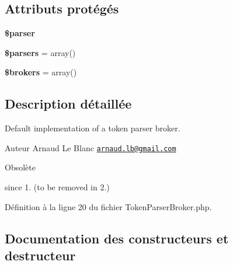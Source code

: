 \subsection*{Attributs protégés}
\begin{DoxyCompactItemize}
\item 
{\bfseries \$parser}\hypertarget{class_twig___token_parser_broker_a147a766daa03d52576c7345fea31c945}{}\label{class_twig___token_parser_broker_a147a766daa03d52576c7345fea31c945}

\item 
{\bfseries \$parsers} = array()\hypertarget{class_twig___token_parser_broker_ae7df9b3add8c1b302615fc85fbd27de0}{}\label{class_twig___token_parser_broker_ae7df9b3add8c1b302615fc85fbd27de0}

\item 
{\bfseries \$brokers} = array()\hypertarget{class_twig___token_parser_broker_a5cd4d3909a056e1cf2d0c68d5d7a89f5}{}\label{class_twig___token_parser_broker_a5cd4d3909a056e1cf2d0c68d5d7a89f5}

\end{DoxyCompactItemize}


\subsection{Description détaillée}
Default implementation of a token parser broker.

\begin{DoxyAuthor}{Auteur}
Arnaud Le Blanc \href{mailto:arnaud.lb@gmail.com}{\tt arnaud.\+lb@gmail.\+com}
\end{DoxyAuthor}
\begin{DoxyRefDesc}{Obsolète}
\item[\hyperlink{deprecated__deprecated000043}{Obsolète}]since 1. (to be removed in 2.) \end{DoxyRefDesc}


Définition à la ligne 20 du fichier Token\+Parser\+Broker.\+php.



\subsection{Documentation des constructeurs et destructeur}
